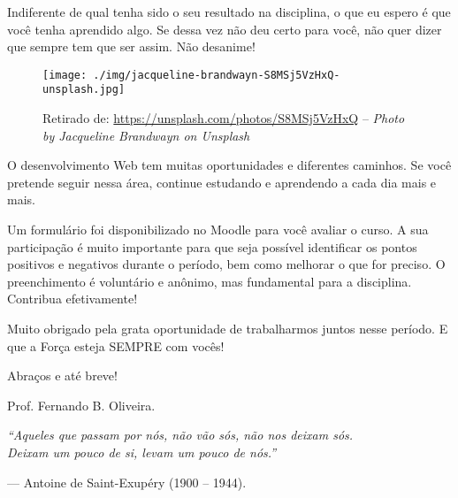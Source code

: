 \documentclass[12pt,a4paper]{article}
\begin{document}
		Indiferente de qual tenha sido o seu resultado na disciplina, o que eu espero é que você tenha aprendido algo. Se dessa vez não deu certo para você, não quer dizer que sempre tem que ser assim. Não desanime!

				
		
		
		
		
		
		\begin{wrapfigure}{I}{0.4\textwidth}
			\begin{center}
				\texttt{[image: ./img/jacqueline-brandwayn-S8MSj5VzHxQ-unsplash.jpg]}
			\end{center}
			\caption{Retirado de: \protect\url{https://unsplash.com/photos/S8MSj5VzHxQ} -- \textit{Photo by Jacqueline Brandwayn on Unsplash}}
		\end{wrapfigure}
		
		O desenvolvimento Web tem muitas oportunidades e diferentes caminhos. Se você pretende seguir nessa área, continue estudando e aprendendo a cada dia mais e mais.  
		
		\vspace*{\fill}

		Um formulário foi disponibilizado no Moodle para você avaliar o curso. A sua participação é muito importante para que seja possível identificar os pontos positivos e negativos durante o período, bem como melhorar o que for preciso. O preenchimento é voluntário e anônimo, mas fundamental para a disciplina. Contribua efetivamente!
		
		\vspace*{\fill}
		
		Muito obrigado pela grata oportunidade de trabalharmos juntos nesse período. E que a Força esteja SEMPRE com vocês!

		\vspace*{\fill}
		
		Abraços e até breve! \par
		Prof. Fernando B. Oliveira.
		



		\vspace*{\fill}
		\epigraph{\textit{``Aqueles que passam por nós, não vão sós, não nos deixam sós. \\ Deixam um pouco de si, levam um pouco de nós.''}}{--- Antoine de Saint-Exupéry (1900 -- 1944).}

	
\end{document}
